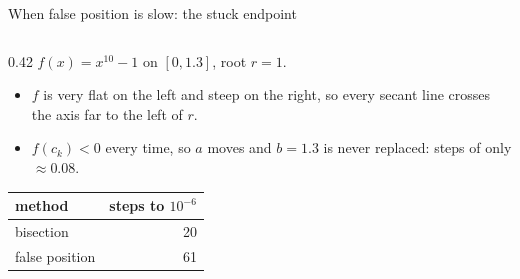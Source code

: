 \documentclass[aspectratio=169]{beamer}
\begin{document}
\begin{frame}{When false position is slow: the stuck endpoint}
\begin{columns}[c]
\begin{column}{0.42\textwidth}
\small
$f(x) = x^{10} - 1$ on $[0, 1.3]$, root $r = 1$.
\begin{itemize}\footnotesize
  \item $f$ is very flat on the left and steep on the right, so every secant line crosses the axis far to the left of $r$.
  \item $f(c_k) < 0$ every time, so $a$ moves and $b = 1.3$ is never replaced: steps of only $\approx 0.08$.
\end{itemize}
\centering
\begin{tabular}{lr}
\toprule
method & steps to $10^{-6}$ \\
\midrule
bisection & 20 \\
false position & 61 \\
\bottomrule
\end{tabular}


\end{column}
\end{columns}
\end{frame}
\end{document}
